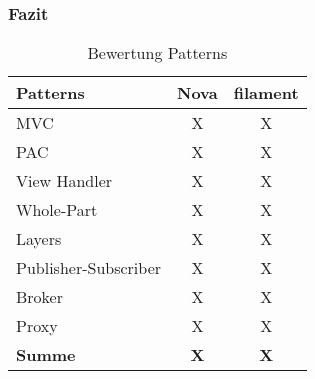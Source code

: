 \subsubsection{Fazit}
\begin{table}[]
    \caption{Bewertung Patterns}
    \label{tab:bewertung-patterns}
    \centering
    \begin{tabular}{|l|c|c|}
        \hline
        \textbf{Patterns}    & \textbf{Nova} & \textbf{filament} \\ \hline
        MVC                  & X             & X                 \\ \hline
        PAC                  & X             & X                 \\ \hline
        View Handler         & X             & X                 \\ \hline
        Whole-Part           & X             & X                 \\ \hline
        Layers               & X             & X                 \\ \hline
        Publisher-Subscriber & X             & X                 \\ \hline
        Broker               & X             & X                 \\ \hline
        Proxy                & X             & X                 \\ \hline
        \textbf{Summe}       & \textbf{X}    & \textbf{X}        \\ \hline
    \end{tabular}
\end{table}

\color{black}
